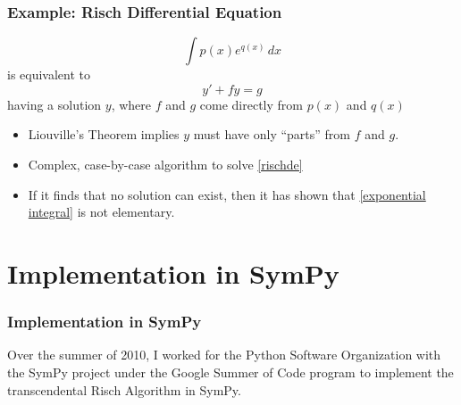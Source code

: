 \documentclass{beamer}
\numberwithin{equation}{section} %
\begin{document}
\begin{frame}
    \frametitle{Example: Risch Differential Equation}
    \pause
    \begin{equation}
    \label{exponential integral}
    \int{p(x)e^{q(x)}\,dx}
    \end{equation}
    is equivalent to 
    \begin{equation}
    \label{rischde}
    y' + fy = g
    \end{equation}
    having a solution $y$, where $f$ and $g$ come directly from $p(x)$
    and $q(x)$
    \pause
    \begin{itemize}
        \item Liouville's Theorem implies $y$ must have only ``parts''
        from $f$ and $g$.
        \pause
        \item Complex, case-by-case algorithm to solve \ref{rischde}
        \pause
        \item If it finds that no solution can exist, then it has shown
        that \ref{exponential integral} is not elementary.
    \end{itemize}
\end{frame}

\section{Implementation in SymPy}

\begin{frame}
    \frametitle{Implementation in SymPy}
    \begin{figure}
   \end{figure}
    Over the summer of 2010, I worked for the Python Software
    Organization with the SymPy project under the Google Summer of Code
    program to implement the transcendental Risch Algorithm in SymPy.
\end{frame}
\end{document}
